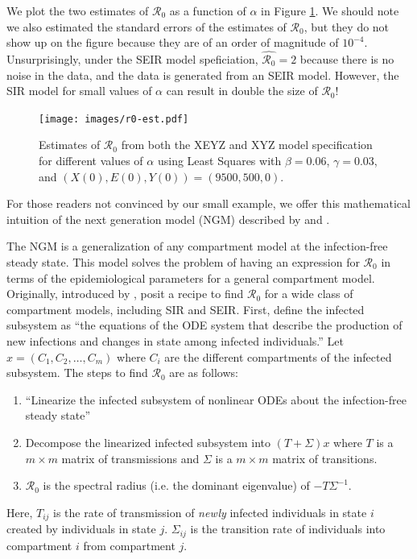 \documentclass[12pt]{article}
\newcommand{\rr}{\ensuremath{\mathcal{R}_0}}
\begin{document}
We plot the two estimates of $\rr$ as a function of $\alpha$ in Figure \ref{fig:r0-alpha}.  We should note we also estimated the standard errors of the estimates of $\rr$, but they do not show up on the figure because they are of an order of magnitude of $10^{-4}$.  Unsurprisingly, under the SEIR model speficiation, $\hat{\rr}=2$ because there is no noise in the data, and the data is generated from an SEIR model.  However, the SIR model for small values of $\alpha$ can result in double the size of $\rr$!


\begin{figure}
  \centering
  \texttt{[image: images/r0-est.pdf]}
  \caption{Estimates of $\rr$ from both the XEYZ and XYZ model specification for different values of $\alpha$ using Least Squares with $\beta=0.06$, $\gamma=0.03$, and $(X(0), E(0), Y(0)) = (9500, 500, 0)$.}\label{fig:r0-alpha}
  \end{figure}

For those readers not convinced by our small example, we offer this mathematical intuition of the next generation model (NGM) described by \cite{diekmann1990} and \cite{diekmann2009}.

 The NGM is a generalization of any compartment model at the infection-free steady state. This model solves the problem of having an expression for $\rr$ in terms of the epidemiological parameters for a general compartment model.  Originally, introduced by \citep{diekmann1990}, \cite{diekmann2009} posit a recipe to find $\rr$ for a wide class of compartment models, including SIR and SEIR. First, define the infected subsystem as ``the equations of the ODE system that describe the production of new infections and changes in state among infected individuals.''  Let $x = (C_1, C_2, \dots, C_m)$ where $C_i$ are the different compartments of the infected subsystem.  The steps to find $\rr$ are as follows:


\begin{enumerate}
\item ``Linearize the infected subsystem of nonlinear ODEs about the infection-free steady state''
\item Decompose the linearized infected subsystem into $(T + \Sigma )x$ where $T$ is a $m\times m$ matrix of transmissions and $\Sigma$ is a $m \times m$ matrix of transitions.
\item $\rr$ is the spectral radius (i.e. the dominant eigenvalue) of $-T \Sigma^{-1}$.  
\end{enumerate}

Here, $T_{ij}$ is the rate of transmission of \textit{newly} infected individuals in state $i$ created by individuals in state $j$.  $\Sigma_{ij}$ is the transition rate of individuals into compartment $i$ from compartment $j$.
\end{document}
